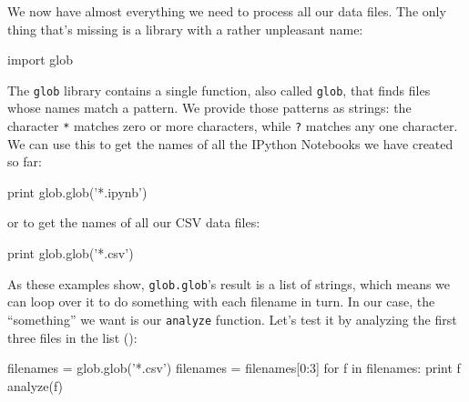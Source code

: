 We now have almost everything we need to process all our data files. The
only thing that's missing is a library with a rather unpleasant name:

\begin{VerbIn}
import glob
\end{VerbIn}

The \texttt{glob} library contains a single function, also called
\texttt{glob}, that finds files whose names match a pattern. We provide
those patterns as strings: the character \texttt{*} matches zero or more
characters, while \texttt{?} matches any one character. We can use this
to get the names of all the IPython Notebooks we have created so far:

\begin{VerbIn}
print glob.glob('*.ipynb')
\end{VerbIn}

\begin{VerbOut}
\end{VerbOut}

or to get the names of all our CSV data files:

\begin{VerbIn}
print glob.glob('*.csv')
\end{VerbIn}

\begin{VerbOut}
\end{VerbOut}

As these examples show, \texttt{glob.glob}'s result is a list of
strings, which means we can loop over it to do something with each
filename in turn. In our case, the ``something'' we want is our
\texttt{analyze} function. Let's test it by analyzing the first three
files in the list ():

\begin{VerbIn}
filenames = glob.glob('*.csv')
filenames = filenames[0:3]
for f in filenames:
    print f
    analyze(f)
\end{VerbIn}

